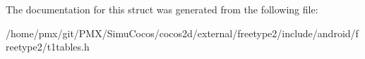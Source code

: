 The documentation for this struct was generated from the following file\+:\begin{DoxyCompactItemize}
\item 
/home/pmx/git/\+P\+M\+X/\+Simu\+Cocos/cocos2d/external/freetype2/include/android/freetype2/t1tables.\+h\end{DoxyCompactItemize}
